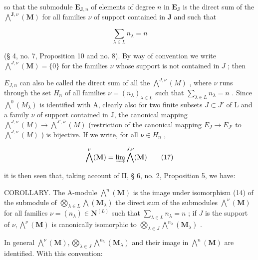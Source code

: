 so that the submodule \(\mathbf{E}_{\mathbf{J},n}\) of elements of degree \(n\) in \(\mathbf{E}_{\mathbf{J}}\) is the direct sum of the \(\bigwedge^{\mathbf{J},\nu}(\mathbf{M})\) for all families \(\nu\) of support contained in \(\mathbf{J}\) and such that

\[
\sum_ {\lambda \in L} n _ {\lambda} = n
\]

(§ 4, no. 7, Proposition 10 and no. 8). By way of convention we write \(\bigwedge^{J,\nu}(\mathbf{M}) = \{0\}\) for the families \(\nu\) whose support is not contained in \(J\) ; then

\(E_{J,n}\) can also be called the direct sum of all the \(\bigwedge^{J,\nu}(M)\) , where \(\nu\) runs through the set \(H_n\) of all families \(\nu = (n_\lambda)_{\lambda \in L}\) such that \(\sum_{\lambda \in L} n_\lambda = n\) . Since \(\bigwedge^0(M_\lambda)\) is identified with A, clearly also for two finite subsets \(J \subset J'\) of L and a family \(\nu\) of support contained in J, the canonical mapping \(\bigwedge^{J,\nu}(M) \to \bigwedge^{J',\nu}(M)\) (restriction of the canonical mapping \(E_J \to E_{J'}\) to \(\bigwedge^{J,\nu}(M)\) ) is bijective. If we write, for all \(\nu \in H_n\) ,

\[
\bigwedge^ {\nu} (\mathbf {M}) = \varinjlim \bigwedge^ {J, \nu} (\mathbf {M})\tag{17}
\]

it is then seen that, taking account of II, § 6, no. 2, Proposition 5, we have:

COROLLARY. The A-module \(\bigwedge^{n}(\mathbf{M})\) is the image under isomorphism (14) of the submodule of \(\bigotimes_{\lambda \in L} \bigwedge (\mathbf{M}_{\lambda})\) the direct sum of the submodules \(\bigwedge^{\nu}(\mathbf{M})\) for all families \(\nu = (n_{\lambda}) \in \mathbf{N}^{(L)}\) such that \(\sum_{\lambda \in L} n_{\lambda} = n\) ; if \(J\) is the support of \(\nu, \bigwedge^{\nu}(\mathbf{M})\) is canonically isomorphic to \(\bigotimes_{\lambda \in J} \bigwedge^{n_{\lambda}}(\mathbf{M}_{\lambda})\) .

In general \(\bigwedge^{\nu}(\mathbf{M}),\bigotimes_{\lambda \in J}\bigwedge^{n_{\lambda}}(\mathbf{M}_{\lambda})\) and their image in \(\bigwedge^n (\mathbf{M})\) are identified. With this convention:

